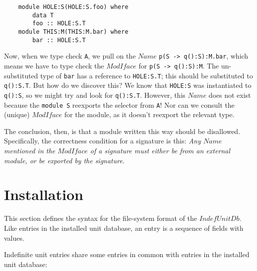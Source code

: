 \documentclass{article}
\newcommand{\I}[1]{\ensuremath{\mathit{#1}}}
\begin{document}
\begin{verbatim}
    module HOLE:S(HOLE:S.foo) where
        data T
        foo :: HOLE:S.T
    module THIS:M(THIS:M.bar) where
        bar :: HOLE:S.T
\end{verbatim}
%
Now, when we type check \verb|A|, we pull on the \I{Name} \verb|p(S -> q():S):M.bar|,
which means we have to type check the \I{ModIface} for \verb|p(S -> q():S):M|.
The un-substituted type of \verb|bar| has a reference to \verb|HOLE:S.T|;
this should be substituted to \verb|q():S.T|.  But how do we discover this?
We know that \verb|HOLE:S| was instantiated to \verb|q():S|, so we might try
and look for \verb|q():S.T|.  However, this \I{Name} does not exist because
the \verb|module S| reexports the selector from \verb|A|!  Nor can we consult
the (unique) \I{ModIface} for the module, as it doesn't reexport the relevant
type.

The conclusion, then, is that a module written this way should be disallowed.
Specifically, the correctness condition for a signature is this: \emph{Any \I{Name}
mentioned in the \I{ModIface} of a signature must either be from an external module, or be
exported by the signature}.

\newpage
\section{Installation}

This section defines the syntax for the file-system format of the \I{IndefUnitDb}.
Like entries in the installed unit database, an entry is a sequence of fields
with values.

Indefinite unit entries share some entries in common with entries in the installed
unit database:
\end{document}
